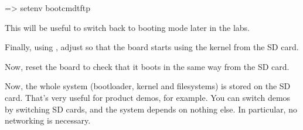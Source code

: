 \begin{ubootinput}
=> setenv bootcmdtftp %
\end{ubootinput}

This will be useful to switch back to  booting mode
later in the labs.

Finally, using , adjust  so that
the board starts using the kernel from the SD card.

Now, reset the board to check that it boots in the same way from the
SD card.

Now, the whole system (bootloader, kernel and filesystems) is
stored on the SD card. That's very useful for product demos, for
example. You can switch demos by switching SD cards, and the
system depends on nothing else. In particular, no networking is
necessary.
